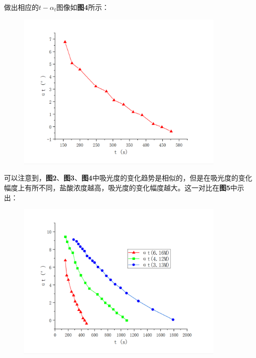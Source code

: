 \documentclass[12pt]{article}
\begin{document}
			做出相应的$t-\alpha_{t}$图像如\textbf{图4}所示：
			\begin{figure}[!h]
				\centering
				\includegraphics[width=0.90\textwidth]{4.png}
			\end{figure}
			\par
			可以注意到，\textbf{图2}、\textbf{图3}、\textbf{图4}中吸光度的变化趋势是相似的，但是在吸光度的变化幅度上有所不同，盐酸浓度越高，吸光度的变化幅度越大。这一对比在\textbf{图5}中示出：\par
			\begin{figure}[!h]
				\centering
				\includegraphics[width=0.90\textwidth]{5.png}
			\end{figure}
			\par
\end{document}
